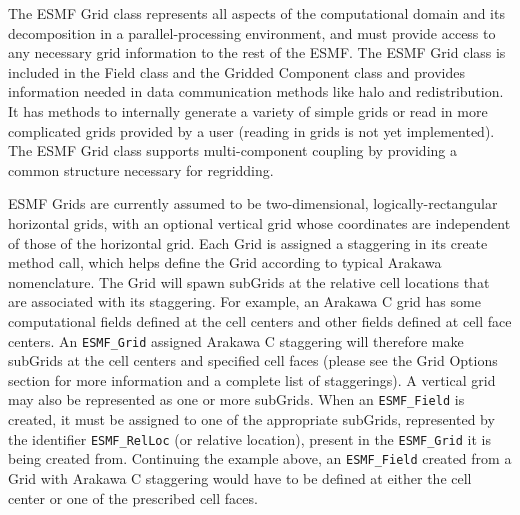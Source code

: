 %


The ESMF Grid class represents all aspects of the computational domain and its
decomposition in a parallel-processing environment, and must provide access to
any necessary grid information to the rest of the ESMF.  The ESMF Grid class
is included in the Field class and the Gridded Component class
and provides information needed in data communication methods like halo and
redistribution.  It has methods to internally generate a variety of
simple grids or read in more complicated grids provided by a user 
(reading in grids is not yet implemented).  The ESMF Grid class supports
multi-component coupling by providing a common structure necessary for regridding.

ESMF Grids are currently assumed to be two-dimensional, logically-rectangular
horizontal grids, with an optional vertical grid whose coordinates are
independent of those of the horizontal grid.  Each Grid is assigned a
staggering in its create method call, which helps define the Grid according
to typical Arakawa nomenclature.  The Grid will spawn subGrids at the relative
cell locations that are associated with its staggering.  For example, an
Arakawa C grid has some computational fields defined at the cell centers
and other fields defined at cell face centers.  An {\tt ESMF\_Grid} assigned
Arakawa C staggering will therefore make subGrids at the cell centers and
specified cell faces (please see the Grid Options section for more information
and a complete list of staggerings).  A vertical grid may also be represented
as one or more subGrids.  When an {\tt ESMF\_Field} is created, it must be
assigned to one of the appropriate subGrids, represented by the identifier
{\tt ESMF\_RelLoc} (or relative location), present in the {\tt ESMF\_Grid} it 
is being created from.  Continuing the example above, an {\tt ESMF\_Field}
created from a Grid with Arakawa C staggering would have to be defined at either
the cell center or one of the prescribed cell faces. 

